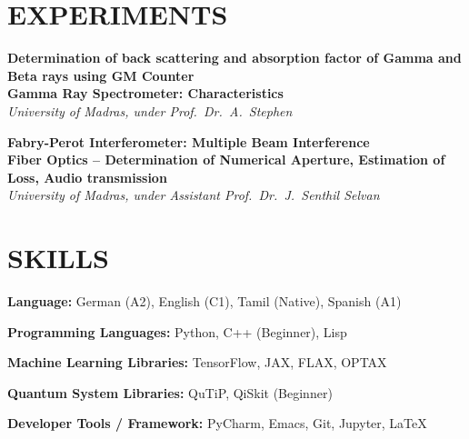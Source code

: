 \documentclass[11pt, a4paper]{article}
\newcommand{\skillrow}[2]{%
  \noindent\textbf{#1:} #2\par\vspace{0pt}
}
\begin{document}
\section{EXPERIMENTS}

\textbf{Determination of back scattering and absorption factor of Gamma and Beta rays using GM Counter}\\
\textbf{Gamma Ray Spectrometer: Characteristics}\\
\textit{University of Madras, under Prof.\ Dr.\ A.\ Stephen}

\vspace{2pt}

\textbf{Fabry-Perot Interferometer: Multiple Beam Interference}\\
\textbf{Fiber Optics -- Determination of Numerical Aperture, Estimation of Loss, Audio transmission}\\
\textit{University of Madras, under Assistant Prof.\ Dr.\ J.\ Senthil Selvan}
\vspace{7pt}
\newcommand{\skillgap}{-4pt}
\section{SKILLS}
\vspace{-0pt}
\skillrow{Language}{German (A2), English (C1), Tamil (Native), Spanish (A1)}\vspace{\skillgap}
\skillrow{Programming Languages}{Python, C++ (Beginner), Lisp}\vspace{\skillgap}
\skillrow{Machine Learning Libraries}{TensorFlow, JAX, FLAX, OPTAX}\vspace{\skillgap}
\skillrow{Quantum System Libraries}{QuTiP, QiSkit (Beginner)}\vspace{\skillgap}
\skillrow{Developer Tools / Framework}{PyCharm, Emacs, Git, Jupyter, \LaTeX}
\end{document}
